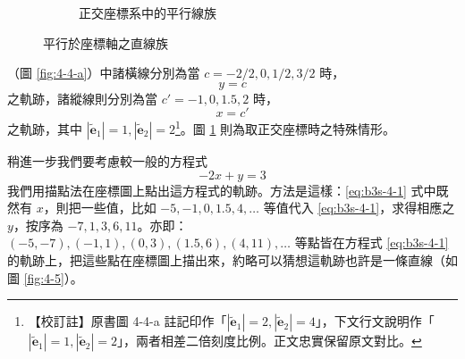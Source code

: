 \begin{figure}[H]
\begin{subfigure}[b]{0.48\textwidth}
\caption{正交座標系中的平行線族}
\label{fig:4-4-b}
\end{subfigure}
\caption{平行於座標軸之直線族}
\label{fig:4-4}
\end{figure}

（圖 \ref{fig:4-4-a}）中諸橫線分別為當 $c = -2/2, 0, 1/2, 3/2$ 時，
\[ y = c \]
之軌跡，諸縱線則分別為當 $c' = -1, 0, 1.5, 2$ 時，
\[ x = c' \]
之軌跡，其中 $|\tilde{\mathbf{e}}_1| = 1, |\tilde{\mathbf{e}}_2| = 2$\footnote{\label{note:b3s-ch4-p136-fig4-4-a-scale}【校訂註】原書圖 4-4-a 註記印作「$|\tilde{\mathbf{e}}_1| = 2, |\tilde{\mathbf{e}}_2| = 4$」，下文行文說明作「$|\tilde{\mathbf{e}}_1| = 1, |\tilde{\mathbf{e}}_2| = 2$」，兩者相差二倍刻度比例。正文忠實保留原文對比。}。圖 \ref{fig:4-4-b} 則為取正交座標時之特殊情形。

稍進一步我們要考慮較一般的方程式
\begin{equation}
-2x + y = 3
\label{eq:b3s-4-1}
\end{equation}
我們用描點法在座標圖上點出這方程式的軌跡。方法是這樣：\eqref{eq:b3s-4-1} 式中既然有 $x$，則把一些值，比如 $-5, -1, 0, 1.5, 4, \dots$ 等值代入 \eqref{eq:b3s-4-1}，求得相應之 $y$，按序為 $-7, 1, 3, 6, 11$。亦即：$(-5, -7), (-1, 1), (0, 3), (1.5, 6), (4, 11), \dots$ 等點皆在方程式 \eqref{eq:b3s-4-1} 的軌跡上，把這些點在座標圖上描出來，約略可以猜想這軌跡也許是一條直線（如圖 \ref{fig:4-5}）。

